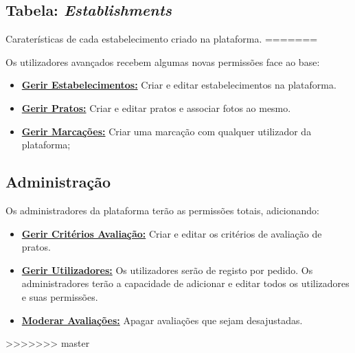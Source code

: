 \documentclass[11pt, a4paper, sans]{article}
\begin{document}
	\subsection{Tabela: \textit{Establishments}} \label{db-table-establishments}

	Caraterísticas de cada estabelecimento criado na plataforma.
=======

	Os utilizadores avançados recebem algumas novas permissões face ao base:

	\begin{itemize}
		\item \underline{\textbf{Gerir Estabelecimentos:}} Criar e editar estabelecimentos na plataforma.
		\item \underline{\textbf{Gerir Pratos:}} Criar e editar pratos e associar fotos ao mesmo.
		\item \underline{\textbf{Gerir Marcações:}} Criar uma marcação com qualquer utilizador da plataforma;
	\end{itemize}

	\subsection{Administração}
	Os administradores da plataforma terão as permissões totais, adicionando:
	\begin{itemize}
		\item \underline{\textbf{Gerir Critérios Avaliação:}} Criar e editar os critérios de avaliação de pratos.
		\item \underline{\textbf{Gerir Utilizadores:}} Os utilizadores serão de registo por pedido. Os administradores
			terão a capacidade de adicionar e editar todos os utilizadores e suas permissões.
		\item \underline{\textbf{Moderar Avaliações:}} Apagar avaliações que sejam desajustadas.
	\end{itemize}
>>>>>>> master
\end{document}
